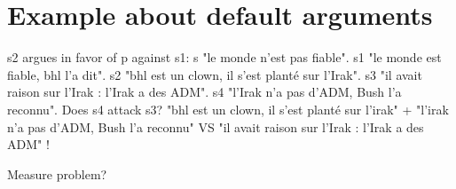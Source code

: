 \documentclass[version=last, pagesize, twoside=semi, DIV=calc, bibliography=totoc, 12pt, a4paper, french, english]{scrartcl}
\begin{document}
\section{Example about default arguments}
s2 argues in favor of p against s1: s "le monde n’est pas fiable". s1 "le monde est fiable, bhl l’a dit". s2 "bhl est un clown, il s’est planté sur l’Irak". s3 "il avait raison sur l’Irak : l’Irak a des ADM". s4 "l’Irak n’a pas d’ADM, Bush l’a reconnu".
Does s4 attack s3?
"bhl est un clown, il s’est planté sur l’irak" + "l’irak n’a pas d’ADM, Bush l’a reconnu" VS "il avait raison sur l’Irak : l’Irak a des ADM" !

Measure problem?

%
\end{document}
